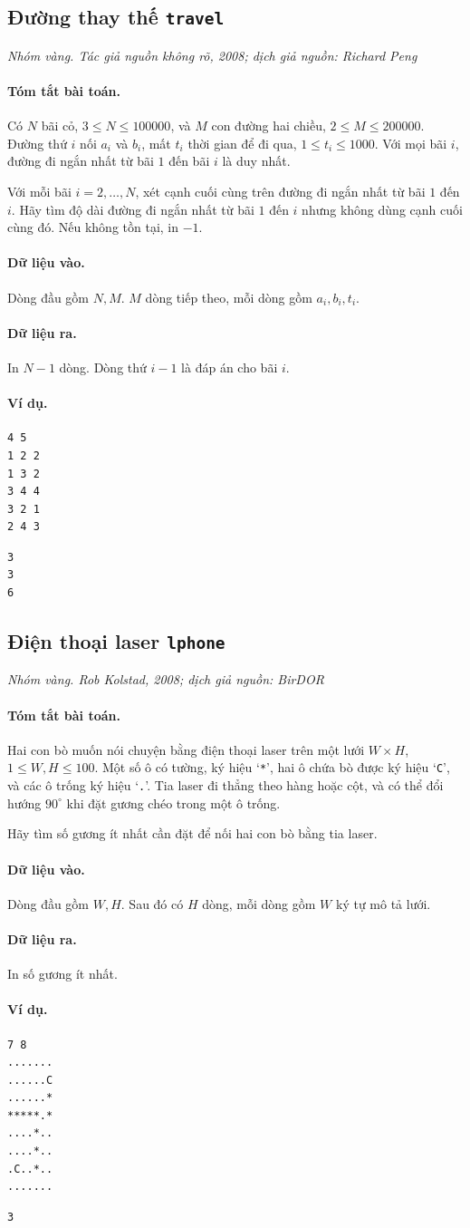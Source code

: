 \documentclass[11pt]{article}
\newcommand{\problem}[4]{%
  \subsection[#1 (#2)]{#1 \hfill {\normalsize\texttt{#2}}}%
  \noindent\textit{#3. #4}\par\smallskip
}
\newcommand{\iosec}[1]{\paragraph{#1}}
\begin{document}
\problem{Đường thay thế}{travel}{Nhóm vàng}{Tác giả nguồn không rõ, 2008; dịch giả nguồn: Richard Peng}

\iosec{Tóm tắt bài toán.}
Có \(N\) bãi cỏ, \(3\le N\le 100000\), và \(M\) con đường hai chiều,
\(2\le M\le 200000\). Đường thứ \(i\) nối \(a_i\) và \(b_i\), mất \(t_i\)
thời gian để đi qua, \(1\le t_i\le 1000\). Với mọi bãi \(i\), đường đi ngắn
nhất từ bãi \(1\) đến bãi \(i\) là duy nhất.

Với mỗi bãi \(i=2,\ldots,N\), xét cạnh cuối cùng trên đường đi ngắn nhất từ
bãi \(1\) đến \(i\). Hãy tìm độ dài đường đi ngắn nhất từ bãi \(1\) đến
\(i\) nhưng không dùng cạnh cuối cùng đó. Nếu không tồn tại, in \(-1\).

\iosec{Dữ liệu vào.}
Dòng đầu gồm \(N,M\). \(M\) dòng tiếp theo, mỗi dòng gồm \(a_i,b_i,t_i\).

\iosec{Dữ liệu ra.}
In \(N-1\) dòng. Dòng thứ \(i-1\) là đáp án cho bãi \(i\).

\iosec{Ví dụ.}
\begin{verbatim}
4 5
1 2 2
1 3 2
3 4 4
3 2 1
2 4 3
\end{verbatim}

\begin{verbatim}
3
3
6
\end{verbatim}

\problem{Điện thoại laser}{lphone}{Nhóm vàng}{Rob Kolstad, 2008; dịch giả nguồn: BirDOR}

\iosec{Tóm tắt bài toán.}
Hai con bò muốn nói chuyện bằng điện thoại laser trên một lưới \(W\times H\),
\(1\le W,H\le 100\). Một số ô có tường, ký hiệu `\texttt{*}', hai ô chứa bò
được ký hiệu `\texttt{C}', và các ô trống ký hiệu `\texttt{.}'. Tia laser đi
thẳng theo hàng hoặc cột, và có thể đổi hướng \(90^\circ\) khi đặt gương
chéo trong một ô trống.

Hãy tìm số gương ít nhất cần đặt để nối hai con bò bằng tia laser.

\iosec{Dữ liệu vào.}
Dòng đầu gồm \(W,H\). Sau đó có \(H\) dòng, mỗi dòng gồm \(W\) ký tự mô tả
lưới.

\iosec{Dữ liệu ra.}
In số gương ít nhất.

\iosec{Ví dụ.}
\begin{verbatim}
7 8
.......
......C
......*
*****.*
....*..
....*..
.C..*..
.......
\end{verbatim}

\begin{verbatim}
3
\end{verbatim}
\end{document}
